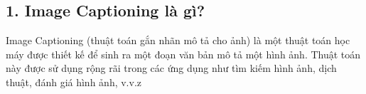 \documentclass[../main.tex]{subfiles}
\begin{document}
\subsection*{1. Image Captioning là gì?}

Image Captioning (thuật toán gắn nhãn mô tả cho ảnh) là một thuật toán học máy được thiết kế để sinh ra một đoạn văn bản mô tả một hình ảnh. Thuật toán này được sử dụng rộng rãi trong các ứng dụng như tìm kiếm hình ảnh, dịch thuật, đánh giá hình ảnh, v.v.z
\end{document}
